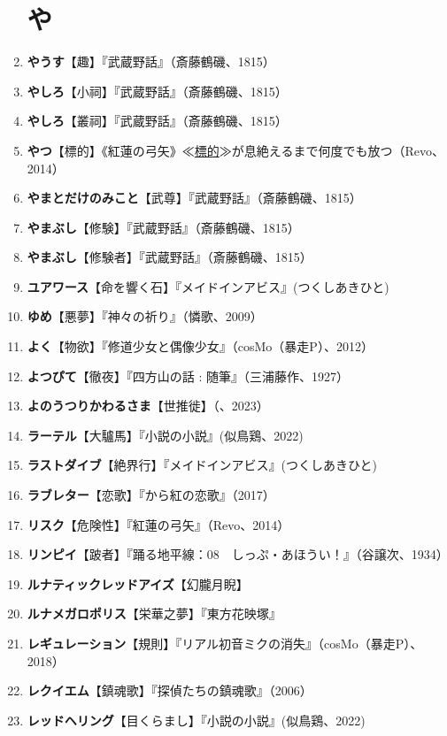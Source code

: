 \documentclass[twocolumn]{jsbook}
\newcommand{\ccite}[1]{《#1》}
\begin{document}
\begin{enumerate}
\section*{や}
    \item \textbf{やうす}【趣】『武蔵野話』（斎藤鶴磯、1815）
    \item \textbf{やしろ}【小祠】『武蔵野話』（斎藤鶴磯、1815）
    \item \textbf{やしろ}【叢祠】『武蔵野話』（斎藤鶴磯、1815）
    \item \textbf{やつ}【標的】\ccite{紅蓮の弓矢}{≪\uline{標的}≫が息絶えるまで何度でも放つ（Revo、2014）}
    \item \textbf{やまとだけのみこと}【武尊】『武蔵野話』（斎藤鶴磯、1815）
    \item \textbf{やまぶし}【修験】『武蔵野話』（斎藤鶴磯、1815）
    \item \textbf{やまぶし}【修験者】『武蔵野話』（斎藤鶴磯、1815）
    \item \textbf{ユアワース}【命を響く石】『メイドインアビス』(つくしあきひと)
    \item \textbf{ゆめ}【悪夢】『神々の祈り』（憐歌、2009）
    \item \textbf{よく}【物欲】『修道少女と偶像少女』（cosMo（暴走P）、2012）
    \item \textbf{よつぴて}【徹夜】『四方山の話 : 随筆』（三浦藤作、1927）
    \item \textbf{よのうつりかわるさま}【世推徙】（、2023）
    \item \textbf{ラーテル}【大驢馬】『小説の小説』(似鳥鶏、2022)
    \item \textbf{ラストダイブ}【絶界行】『メイドインアビス』(つくしあきひと)
    \item \textbf{ラブレター}【恋歌】『から紅の恋歌』（2017）
    \item \textbf{リスク}【危険性】『紅蓮の弓矢』（Revo、2014）
    \item \textbf{リンピイ}【跛者】『踊る地平線：08　しっぷ・あほうい！』（谷譲次、1934）
    \item \textbf{ルナティックレッドアイズ}【幻朧月睨】
    \item \textbf{ルナメガロポリス}【栄華之夢】『東方花映塚』
    \item \textbf{レギュレーション}【規則】『リアル初音ミクの消失』（cosMo（暴走P）、2018）
    \item \textbf{レクイエム}【鎮魂歌】『探偵たちの鎮魂歌』（2006）
    \item \textbf{レッドヘリング}【目くらまし】『小説の小説』(似鳥鶏、2022)

\end{enumerate}
\end{document}
